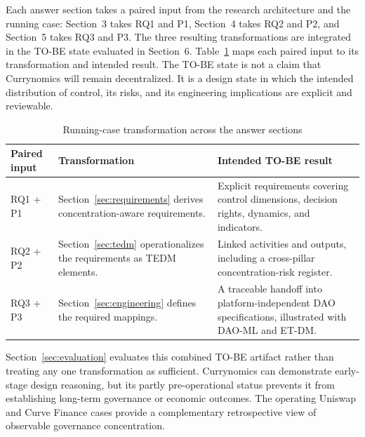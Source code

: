 \documentclass[referee,sn-basic]{sn-jnl}
\begin{document}
Each answer section takes a paired input from the research architecture and the
running case: Section~3 takes RQ1 and P1, Section~4 takes RQ2 and P2, and
Section~5 takes RQ3 and P3. The three resulting transformations are integrated
in the TO-BE state evaluated in Section~6.
Table~\ref{tab:case-transformation} maps each paired input to its transformation
and intended result. The TO-BE state is not a claim that Currynomics will remain
decentralized. It is a design state in which the intended distribution of
control, its risks, and its engineering implications are explicit and
reviewable.

\begin{table}[!t]
\caption{Running-case transformation across the answer sections}
\label{tab:case-transformation}
\centering
\begin{tabularx}{\linewidth}{@{}p{.16\linewidth}X X@{}}
\toprule
Paired input & Transformation & Intended TO-BE result \\
\midrule
RQ1 + P1 & Section~\ref{sec:requirements} derives concentration-aware
requirements. & Explicit requirements covering control dimensions,
decision rights, dynamics, and indicators. \\
RQ2 + P2 & Section~\ref{sec:tedm} operationalizes the requirements as TEDM
elements. & Linked activities and outputs, including a cross-pillar
concentration-risk register. \\
RQ3 + P3 & Section~\ref{sec:engineering} defines the required mappings. &
A traceable handoff into platform-independent DAO specifications,
illustrated with DAO-ML and ET-DM. \\
\bottomrule
\end{tabularx}
\end{table}
\FloatBarrier

Section~\ref{sec:evaluation} evaluates this combined TO-BE artifact rather than
treating any one transformation as sufficient. Currynomics can demonstrate
early-stage design reasoning, but its partly pre-operational status prevents it
from establishing long-term governance or economic outcomes. The operating
Uniswap and Curve Finance cases provide a complementary retrospective view of
observable governance concentration.
\end{document}
